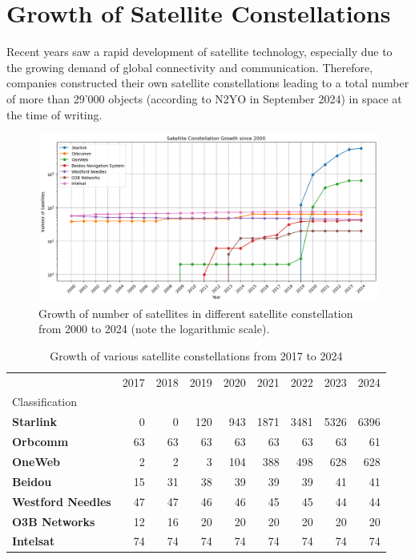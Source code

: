 \section{Growth of Satellite Constellations} \label{sec:satellite-constellations}

Recent years saw a rapid development of satellite technology, especially due to
the growing demand of global connectivity and communication. Therefore,
companies constructed their own satellite constellations leading to a total
number of more than 29'000 objects (according to N2YO in September 2024) in
space at the time of writing.

\begin{figure}[ht]
	\includegraphics[width=\textwidth]{./chapters/2-background/satellites/img/sattelite-dev.png}
	\caption{Growth of number of satellites in different satellite constellation from 2000 to 2024 (note the logarithmic scale).}
	\label{fig:growth-satellite-constellations}
\end{figure}

\begin{table}
	\caption{Growth of various satellite constellations from 2017 to 2024}
	\label{fig:satellite-constellations-short}
	\begin{tabular}{lrrrrrrrr}
		\toprule
		                          & 2017 & 2018 & 2019 & 2020 & 2021 & 2022 & 2023 & 2024 \\
		Classification            &      &      &      &      &      &      &      &      \\
		\midrule
		\textbf{Starlink}         & 0    & 0    & 120  & 943  & 1871 & 3481 & 5326 & 6396 \\
		\textbf{Orbcomm}          & 63   & 63   & 63   & 63   & 63   & 63   & 63   & 61   \\
		\textbf{OneWeb}           & 2    & 2    & 3    & 104  & 388  & 498  & 628  & 628  \\
		\textbf{Beidou}           & 15   & 31   & 38   & 39   & 39   & 39   & 41   & 41   \\
		\textbf{Westford Needles} & 47   & 47   & 46   & 46   & 45   & 45   & 44   & 44   \\
		\textbf{O3B Networks}     & 12   & 16   & 20   & 20   & 20   & 20   & 20   & 20   \\
		\textbf{Intelsat}         & 74   & 74   & 74   & 74   & 74   & 74   & 74   & 74   \\
		\bottomrule
	\end{tabular}
\end{table}


